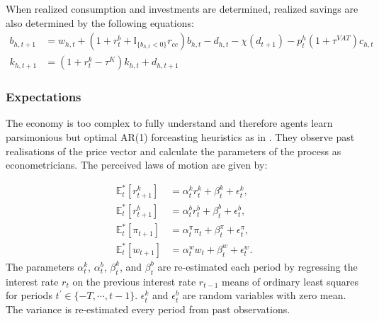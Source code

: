 When realized consumption and investments are determined, realized savings are also determined by the following equations:
\begin{align}
b_{h,t+1} &= w_{h,t} +\left(1+r_t^b+\mathbb{I}_{\{b_{h,t}<0\}}r_{cc}\right) b_{h,t}-d_{h,t}-\chi (d_{t+1})-p^h_t (1+\tau^{VAT})c_{h,t}\\
    k_{h,t+1} &= \left(1+r^k_t-\tau^K\right) k_{h,t}+d_{h,t+1}
\end{align}



\subsubsection{Expectations}
The economy is too complex to fully understand and therefore agents learn parsimonious but optimal AR(1) forceasting heuristics as in \cite{hommes_behavioral_2014}. They observe past realisations of the price vector and calculate the parameters of the process as econometricians. The perceived laws of motion are given by:

\begin{align}    \mathbb{E}^*_t[r^k_{t+1}]&=\alpha^k_{t} r^k_t +\beta^k_{t}+\epsilon^k_t,\\    \mathbb{E}^*_t[r^b_{t+1}]&=\alpha^b_{t} r^b_t +\beta^b_{t}+\epsilon^b_t, \\
 \mathbb{E}^*_t[\pi_{t+1}] &=\alpha^\pi_t \pi_t+\beta^\pi_{t}+\epsilon^\pi_{t}, \\
\mathbb{E}^*_t[w_{t+1}]&=\alpha^w_{t} w_t +\beta^w_{t}+\epsilon^w_t. 
\end{align}
The parameters $\alpha_{t}^{k}$, $\alpha_{t}^{b}$, $\beta_{t}^{k}$, and $\beta_{t}^{b}$ are re-estimated each period by regressing the interest rate $r_{t}$ on the previous interest rate $r_{t-1}$ means of ordinary least squares for periods $t^\prime \in \{-T,\cdots,t-1\}$. $\epsilon^k_t$ and $\epsilon^b_t$ are random variables with zero mean. The variance is re-estimated every period from past observations. 

